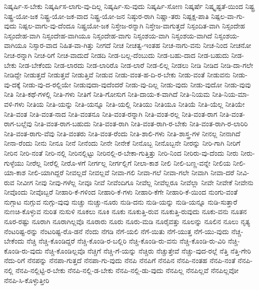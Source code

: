 {ನಿಷ್ಕರ್ಷಿ-ಸ-ಬೇಕು
ನಿಷ್ಕರ್ಷಿಸ-ಲಾಗು-ವು-ದಿಲ್ಲ
ನಿಷ್ಕರ್ಷಿ-ಸು-ವುದು
ನಿಷ್ಕರ್ಷಿ-ಸೋಣ
ನಿಷ್ಕರ್ಷೆ
ನಿಷ್ಕೃಷ್ಟತೆ-ಯಿಂದ
ನಿಷ್ಟ್ರ
ನಿಷ್ಟ್ರ-ಯೋ-ಜಕ
ನಿಷ್ಟ್ರ-ಯೋ-ಜಕ-ವಾದ
ನಿಷ್ಟ್ರ-ಯೋ-ಜನ
ನಿಷ್ಠುರ-ರಾಗಿ
ನಿಷ್ಣಾ-ತರು
ನಿಷ್ಪಕ್ಷ-ಪಾತಿ
ನಿಷ್ಪಲ-ವಾ-ಗು-ವುದು
ನಿಷ್ಪಲ-ವಾಗು-ವು-ದೆಂದೂ
ನಿಷ್ಪ್ರಯೋ-ಜಕ
ನಿಸ್ತೇಜ-ರನ್ನಾಗಿ
ನಿಸ್ತೇಜ-ವಾಗುತ್ತದೆ
ನಿಸ್ಪಂದಿತ-ವಾಗಿ
ನಿಸ್ಸಂದೇಹ
ನಿಸ್ಸಂದೇಹ-ವಾಗಿ
ನಿಸ್ಸಂದೇಹ-ವಾಗಿಯೂ
ನಿಸ್ಸಂದೇಹ-ವಾಗು
ನಿಸ್ಸಂಶಯ-ವಾಗಿ
ನಿಸ್ಸಂಶಯ-ವಾಗಿದೆ
ನಿಸ್ಸಂಶಯ-ವಾಗಿಯೂ
ನಿಸ್ಸಾರ-ವಾದ
ನಿಹಿತ-ವಾ-ಗಿತ್ತು
ನೀಗದೆ
ನೀಚ
ನೀಚತ್ವ-ಇಂತಹ
ನೀಚ-ನಾಗು-ವನು
ನೀಚ-ನಿಂದ
ನೀಚನೋ
ನೀಚ-ರನ್ನಾಗಿ
ನೀಚ-ರಿಗೆ
ನೀಚ-ವಾದುದೆ
ನೀಡದಿ
ನೀಡ-ಬಲ್ಲ-ದೆಂಬುದು
ನೀಡ-ಬಹು-ದಾದ
ನೀಡ-ಬಹುದು
ನೀಡ-ಬೇಕು
ನೀಡ-ಬೇಕೆಂದು
ನೀಡ-ಲಾರದು
ನೀಡ-ಲಾರಿರೊ
ನೀಡ-ಲಾರೆ
ನೀಡ-ಲಿಲ್ಲ
ನೀಡಲು
ನೀಡಿ
ನೀಡಿದ
ನೀಡಿ-ದಾ-ಗಲೇ
ನೀಡಿದ್ದೇ
ನೀಡುತ್ತದೆ
ನೀಡುತ್ತವೆ
ನೀಡುತ್ತಿವೆ
ನೀಡುವ
ನೀಡು-ವಂತ-ಹ-ದಿ-ರ-ಬೇಕು
ನೀಡು-ವಂತೆ
ನೀಡುವನು
ನೀಡು-ವು-ದಕ್ಕೆ
ನೀಡು-ವು-ದ-ರಲ್ಲಿಯೇ
ನೀಡುವುದಾ-ವುದೆಂದರೆ
ನೀಡು-ವು-ದಿಲ್ಲ
ನೀಡು-ವುದು
ನೀಡು-ವುದೋ
ನೀಡು-ವುವು
ನೀತಿ
ನೀತಿ-ಕಥೆ-ಗಳಲ್ಲಿ
ನೀತಿ-ಗಳು
ನೀತಿಗೆ
ನೀತಿ-ಗೋಸುಗ
ನೀತಿ-ದಾಯ-ಕ-ವಾಗಿದೆ
ನೀತಿ-ನಿಯಮ
ನೀತಿ-ನಿಯ-ಮಾ-ವಳಿ-ಗಳು
ನೀತಿಯ
ನೀತಿ-ಯನ್ನು
ನೀತಿ-ಯನ್ನೂ
ನೀತಿ-ಯಲ್ಲಿ
ನೀತಿಯು
ನೀತಿಯೂ
ನೀತಿಯೆ
ನೀತಿ-ಯೆಲ್ಲ
ನೀತಿಯೇ
ನೀತಿ-ವಂತ
ನೀತಿ-ವಂತ-ನಾದ
ನೀತಿ-ವಂತನೂ
ನೀತಿ-ವಂತ-ರನ್ನಾಗಿ
ನೀತಿ-ವಂತ-ರಲ್ಲ
ನೀತಿ-ವಂತ-ರಾಗ
ನೀತಿ-ವಂತ-ರಾಗ-ಬಲ್ಲೆವು
ನೀತಿ-ವಂತ-ರಾಗ-ಬಹುದು
ನೀತಿ-ವಂತ-ರಾಗಿ
ನೀತಿ-ವಂತ-ರಾಗಿ-ರ-ಬೇಕು
ನೀತಿ-ವಂತ-ರಾಗಿ-ರ-ಲಾರಿರಿ
ನೀತಿ-ವಂತ-ರಾಗು-ವೆವು
ನೀತಿ-ವಂತರು
ನೀತಿ-ವಂತ-ರೆಂದು
ನೀತಿ-ಶಾಲಿ-ಗಳು
ನೀತಿ-ಶಾಸ್ತ್ರ-ಗಳ
ನೀನಲ್ಲ
ನೀನಾಗಿದೆ
ನೀನಾ-ರೆಂದು
ನೀನು
ನೀನೂ
ನೀನೆ
ನೀನೆಂದು
ನೀನೇ
ನೀನೇಕೆ
ನೀನೊಬ್ಬ
ನೀನೊಬ್ಬನೇ
ನೀರನ್ನು
ನೀರಿ-ಗಾಗಿ
ನೀರಿಗೆ
ನೀರಿನ
ನೀರಿ-ನಂತೆ
ನೀರಿ-ನಲ್ಲಿ
ನೀರಿನಲ್ಲಿಟ್ಟು
ನೀರಿನಲ್ಲಿ-ರ-ಬೇಕಾ-ಗುತ್ತಿತ್ತು
ನೀರಿ-ನಿಂದ
ನೀರಿರು-ವು-ದೆಂದು
ನೀರು
ನೀರು-ಗುಳ್ಳೆಯು
ನೀರೆಲ್ಲ
ನೀರೆಲ್ಲಿ
ನೀರೊ-ಳಗೆ
ನೀರ್ಗಲ್ಲ
ನೀರ್ಗಲ್ಲಿಗೆ
ನೀಲಾ-ಕಾಶ
ನೀಲಿ
ನೀಲಿ-ಬಣ್ಣ-ವನ್ನೇ
ನೀಲಿಯ
ನೀಲಿ-ಯಾ-ಕಾಶ
ನೀಲಿ-ಯಾಗಿದ್ದರೆ
ನೀವಲ್ಲದೆ
ನೀವಲ್ಲವೆ
ನೀವಾ-ಗಲಿ
ನೀವಾ-ಗಲೆ
ನೀವಾ-ಗಲೇ
ನೀವಾಗಿ
ನೀವಾ-ದರೆ
ನೀವಿ-ರುವ
ನೀವೀಗ
ನೀವು
ನೀವು-ಗಳೆಲ್ಲ
ನೀವೂ
ನೀವೆ
ನೀವೆಂದಿಗೂ
ನೀವೆಲ್ಲ
ನೀವೆಲ್ಲರೂ
ನೀವೆಲ್ಲಾ
ನೀವೇ
ನೀವೇಕೆ
ನೀವೇನು
ನೀವೊಂದು
ನೀವೊಬ್ಬರೆ
ನೀಹಾರಿ-ಕೆ-ಗಳಿಂದ
ನೀಹಾರಿ-ಕೆ-ಗಳು
ನೀಹಾರಿ-ಕೆಗೇ
ನೀಹಾರಿ-ಕೆ-ಯಿಂದ
ನುಂಗು-ವಂತೆ
ನುಗ್ಗಾಟ
ನುಗ್ಗುವ
ನುಗ್ಗು-ವುವು
ನುಚ್ಚು
ನುಚ್ಚು-ನೂರು
ನುಡಿ-ದನು
ನುಡಿ-ಯನ್ನು
ನುಡಿ-ಯನ್ನೂ
ನುಡಿ-ಸುತ್ತಾರೆ
ನುಣಚಿ-ಕೊಳ್ಳುವ
ನುರಿತ
ನುಸುಳಿ
ನೂಕಲು
ನೂಕಿ
ನೂಕು
ನೂಕುತ್ತಿ-ರುವ
ನೂಕುತ್ತಿ-ರುವುದು
ನೂಕು-ವನು
ನೂತನ
ನೂರ-ರಷ್ಟು
ನೂರಾಗಿ
ನೂರಾಗಿಲ್ಲವೊ
ನೂರಾರು
ನೂರು
ನೂರು-ಮಡಿ
ನೂರೈವತ್ತು
ನೂಲನ್ನು
ನೂಲಿನ
ನೂಲು
ನೃತ್ಯ
ನೆಂಟರಿಷ್ಟ-ರನ್ನು
ನೆಂಟರಿಷ್ಟ-ರೊ-ಡನೆ
ನೆಂದು
ನೆಗಡಿ
ನೆಗೆ-ಯಲಿ
ನೆಗೆ-ಯಿತು
ನೆಗೆ-ಯುತ್ತ
ನೆಗೆ-ಯು-ವುದು
ನೆಚ್ಚ-ಬೇಕೆಂದು
ನೆಚ್ಚಿ
ನೆಚ್ಚಿ-ಕೊಂಡಿದ್ದರೆ
ನೆಚ್ಚಿ-ಕೊಂಡಿ-ರ-ಬಲ್ಲಿರಿ
ನೆಚ್ಚಿ-ಕೊಂಡಿ-ರು-ವನು
ನೆಚ್ಚಿ-ಕೊಂಡಿ-ರು-ವಿರಿ
ನೆಚ್ಚಿ-ಕೊಂಡಿ-ರು-ವುದು
ನೆಚ್ಚಿ-ಕೊಂಡಿಲ್ಲವೊ
ನೆಚ್ಚಿಗೆ
ನೆಚ್ಚಿ-ಗೆ-ಯನ್ನು
ನೆಚ್ಚಿರು
ನೆಚ್ಚುತ್ತೇವೆ
ನೆಚ್ಚು-ವುದ-ರಲ್ಲೆ
ನೆತ್ತಿ
ನೆತ್ತಿ-ಗೇರಿ
ನೆದು-ರಿಗೆ
ನೆನಪನ್ನು
ನೆನಪಾ-ಗುತ್ತದೆ
ನೆನಪಾ-ಗು-ವುದು
ನೆನಪಿ
ನೆನಪಿಗೆ
ನೆನಪಿನ
ನೆನಪಿ-ನಂತಹ
ನೆನಪಿ-ನಂತೆ
ನೆನಪಿ-ನಲ್ಲಿ
ನೆನಪಿ-ನಲ್ಲಿಟ್ಟಿ-ರ-ಬೇಕು
ನೆನಪಿ-ನಲ್ಲಿ-ಡ-ಬೇಕು
ನೆನಪಿ-ನಲ್ಲಿ-ಡು-ವುದು
ನೆನಪಿಲ್ಲ
ನೆನಪಿಲ್ಲವೆ
ನೆನಪಿಲ್ಲವೋ
ನೆನಪಿ-ಸಿ-ಕೊಳ್ಳುತ್ತೀರಿ
}
